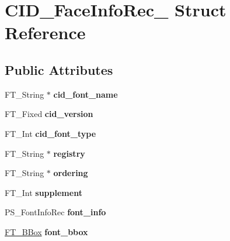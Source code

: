 \hypertarget{struct_c_i_d___face_info_rec__}{
\section{CID\_\-FaceInfoRec\_\- Struct Reference}
\label{struct_c_i_d___face_info_rec__}
}
\subsection*{Public Attributes}
\begin{DoxyCompactItemize}
\item 
\hypertarget{struct_c_i_d___face_info_rec___a804ff6d8a672236f258bfe7baf20867a}{
FT\_\-String $\ast$ {\bfseries cid\_\-font\_\-name}}
\label{struct_c_i_d___face_info_rec___a804ff6d8a672236f258bfe7baf20867a}

\item 
\hypertarget{struct_c_i_d___face_info_rec___af37ddd46827a8e45fbcce60f43e2f61c}{
FT\_\-Fixed {\bfseries cid\_\-version}}
\label{struct_c_i_d___face_info_rec___af37ddd46827a8e45fbcce60f43e2f61c}

\item 
\hypertarget{struct_c_i_d___face_info_rec___a83ce2384925f2fec44a823cf635abe8c}{
FT\_\-Int {\bfseries cid\_\-font\_\-type}}
\label{struct_c_i_d___face_info_rec___a83ce2384925f2fec44a823cf635abe8c}

\item 
\hypertarget{struct_c_i_d___face_info_rec___a7f553f371d2c960b4c46876f748f5c0d}{
FT\_\-String $\ast$ {\bfseries registry}}
\label{struct_c_i_d___face_info_rec___a7f553f371d2c960b4c46876f748f5c0d}

\item 
\hypertarget{struct_c_i_d___face_info_rec___acbc231cd616375331c2c1a7bb31b2f87}{
FT\_\-String $\ast$ {\bfseries ordering}}
\label{struct_c_i_d___face_info_rec___acbc231cd616375331c2c1a7bb31b2f87}

\item 
\hypertarget{struct_c_i_d___face_info_rec___a6d35a867d12ca9cfa6ab06cf329d0354}{
FT\_\-Int {\bfseries supplement}}
\label{struct_c_i_d___face_info_rec___a6d35a867d12ca9cfa6ab06cf329d0354}

\item 
\hypertarget{struct_c_i_d___face_info_rec___ab7a975d269f3d2bd16554d2c3c1ba05f}{
PS\_\-FontInfoRec {\bfseries font\_\-info}}
\label{struct_c_i_d___face_info_rec___ab7a975d269f3d2bd16554d2c3c1ba05f}

\item 
\hypertarget{struct_c_i_d___face_info_rec___a48fe4e9246535f547241028cbf8d8b41}{
\hyperlink{struct_f_t___b_box__}{FT\_\-BBox} {\bfseries font\_\-bbox}}
\label{struct_c_i_d___face_info_rec___a48fe4e9246535f547241028cbf8d8b41}


\end{DoxyCompactItemize}
